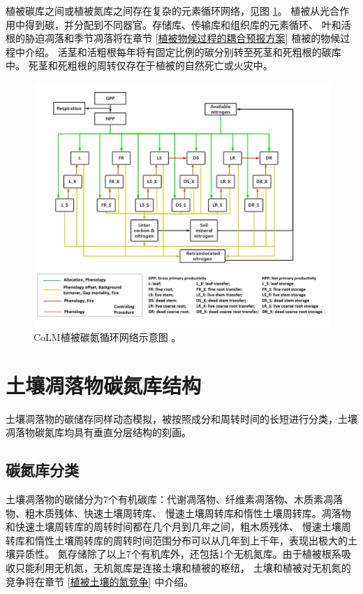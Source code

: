 植被碳库之间或植被氮库之间存在复杂的元素循环网络，见图 \ref{fig:CoLM植被碳氮循环网络示意图}。
植被从光合作用中得到碳，并分配到不同器官。存储库、传输库和组织库的元素循环、
叶和活根的胁迫凋落和季节凋落将在章节 \ref{植被物候过程的耦合预报方案} 植被的物候过程中介绍。
活茎和活粗根每年将有固定比例的碳分别转至死茎和死粗根的碳库中。
死茎和死粗根的周转仅存在于植被的自然死亡或火灾中。
{
\begin{figure}[]
\centering
\includegraphics{Figures/碳氮库结构/CoLM植被碳氮循环网络示意图.png}
\caption{CoLM植被碳氮循环网络示意图 \citep{lu2020full}。}
\label{fig:CoLM植被碳氮循环网络示意图}
\end{figure}
}

\section{土壤凋落物碳氮库结构}\label{土壤凋落物碳氮库结构}
土壤凋落物的碳储存同样动态模拟，被按照成分和周转时间的长短进行分类，土壤凋落物碳氮库均具有垂直分层结构的刻画。
\subsection{碳氮库分类}\label{碳氮库分类}
土壤凋落物的碳储分为7个有机碳库：代谢凋落物、纤维素凋落物、木质素凋落物、粗木质残体、快速土壤周转库、
慢速土壤周转库和惰性土壤周转库。凋落物和快速土壤周转库的周转时间都在几个月到几年之间，粗木质残体、
慢速土壤周转库和惰性土壤周转库的周转时间范围分布可以从几年到上千年，表现出极大的土壤异质性。
氮存储除了以上7个有机库外，还包括1个无机氮库。由于植被根系吸收只能利用无机氮，无机氮库是连接土壤和植被的枢纽，
土壤和植被对无机氮的竞争将在章节 \ref{植被土壤的氮竞争} 中介绍。


